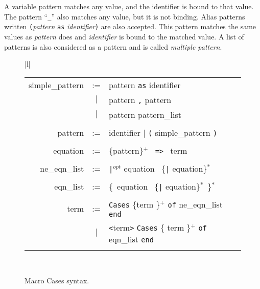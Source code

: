 A variable pattern matches any value, and the
identifier is bound to that value. The pattern ``\verb+_+'' also matches
any value, but it is not binding. Alias patterns written \verb+(+{\sl pattern} \verb+as+ {\sl
identifier}\verb+)+ are also accepted. This pattern matches the same values as
{\sl pattern} does   and
{\sl identifier} is bound to the matched value.
A list of patterns is also considered as a pattern and is called {\em
multiple pattern}.

\begin{figure}[t]
\begin{center}
\begin{sl}
\begin{tabular}{|l|}\hline  \\
\begin{tabular}{rcl}%
simple\_pattern  & := &  pattern \verb+as+  identifier \\
                  &$|$ &  pattern \verb+,+ pattern \\ 
                  &$|$ &  pattern pattern\_list \\ && \\

pattern  & := & identifier  $|$ \verb+(+ simple\_pattern \verb+)+ \\ &&\\


equation & := &  \{pattern\}$^+$ ~\verb+=>+ ~term \\ && \\

ne\_eqn\_list & := & \verb+|+$^{opt}$ equation~ \{\verb+|+ equation\}$^*$  \\ &&\\

eqn\_list & := & \{~equation~ \{\verb+|+ equation\}$^*$~\}$^*$\\ &&\\


term & := &  
\verb+Cases+ \{term \}$^+$ \verb+of+ ne\_eqn\_list \verb+end+ \\
&$|$ & \verb+<+term\verb+>+ \verb+Cases+ \{ term \}$^+$
\verb+of+ eqn\_list \verb+end+ \\&& %
\end{tabular} \\ \hline
\end{tabular} 
\end{sl} \end{center}
\caption{Macro Cases syntax.}
\label{grammar}
\end{figure}


